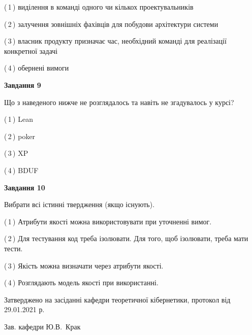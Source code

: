 \documentclass[10pt, ukrainian]{article}
\begin{document}
{\begin {large}
(\,1\,) виділення в команді одного чи кількох проектувальників%



(\,2\,) залучення зовнішніх фахівців для побудови архітектури системи%



(\,3\,) власник продукту призначає час, необхідний команді для реалізації конкретної задачі%



(\,4\,) обернені вимоги%


{\begin {center}\textbf{Завдання 9}\end {center}}\par
Що з наведеного нижче не розглядалось та навіть не згадувалось у курсі?\par
\vspace{2mm}



(\,1\,) Lean%



(\,2\,) poker%



(\,3\,) XP%



(\,4\,) BDUF%


{\begin {center}\textbf{Завдання 10}\end {center}}\par
Вибрати всі істинні твердження (якщо існують).\par
\vspace{2mm}



(\,1\,) Атрибути якості можна використовувати при уточненні вимог.%



(\,2\,) Для тестування код треба ізолювати. Для того, щоб ізолювати, треба мати тести.%



(\,3\,) Якість можна визначати через атрибути якості.%



(\,4\,) Розглядають модель якості при використанні.%



\end {large}}
{\vspace{5mm}\smallskip \begin {small} Затверджено на засіданні кафедри теоретичної кібернетики, протокол  від   29.01.2021 р.\par\smallskip\smallskip
{\parbox {6.5 cm}{Зав. кафедри \dotfill Ю.В.~Крак}} \end{small}}
\newpage
\end{document}
